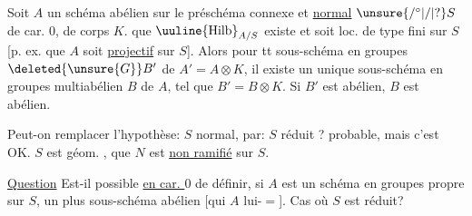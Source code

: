   Soit $A$ un schéma abélien sur le
 préschéma connexe et \uline{normal} $\unsure{/^{\circ}|/|?}S$ de
car. $0$, de corps $K$. 
  que
$\uuline{\mathrm{Hilb}}_{A/S}$ existe et soit loc. de type fini sur $S$
[p. ex. que $A$ soit \uline{projectif} sur $S$]. Alors
pour tt sous-schéma en groupes $\deleted{\unsure{G}}B'$ de
$A'=A\otimes K$, il existe un unique sous-schéma
en groupes multiabélien $B$ de $A$,
tel que $B'=B\otimes K$. Si $B'$ est abélien, $B$
est abélien.

Peut-on remplacer l'hypothèse: $S$ normal,
par: $S$ réduit ?  
probable, mais  c'est OK.  $S$ est géom.
,    que $N$ est
\uline{non ramifié} sur $S$.

\uline{Question}  Est-il possible \uline{en car. $0$} de définir, si
$A$ est un  schéma en groupes propre sur $S$,
un plus  sous-schéma abélien [qui
    $A$ lui-$=$]. Cas
où $S$ est réduit?
